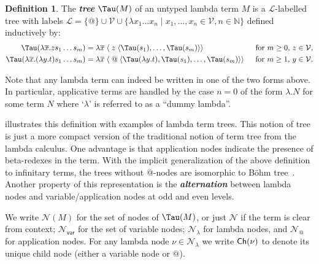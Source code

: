 \documentclass[xchauthor,chkrefs,GCNS,amsmath,amsthm,rotating,leaveRGB]{tcsg}
\makeatletter
\renewcommand{\index}[1]{}
\theoremstyle{plain}
\theoremstyle{definition}
\newtheorem{definition}{Definition}[section]
\newcommand{\VarSet}{\mathcal{V}}
\newcommand{\Nodes}{\mathcal{N}}
\newcommand{\NodesVar}{\Nodes_{\mathsf{var}}}
\newcommand{\NodesLmd}{\Nodes_\lambda}
\newcommand{\NodesApp}{\Nodes_@}
\newcommand{\child}{{\mathsf{\small Ch}}}
\newcommand{\ctree}{\Tau}
\makeatother
\begin{document}
\begin{definition}
The \textbf{\emph{tree}}\index{tree} $\ctree (M)$ of an untyped lambda term
$M$ is a $\mathcal{L}$-labelled tree with labels $\mathcal{L} = \{ @ \} \cup
\VarSet \cup  \{ \lambda x_{1} \ldots x_{n} \mid x_{1} ,\ldots , x_{n} \in
\VarSet , n\in \mathbb {N}\}$ defined inductively by:
%
\begin{align*}
\ctree (\lambda \overline{x} . z s_{1} \ldots s_{m}) &= \lambda
\overline{x}\; \langle \; z\; \langle \ctree (s_{1}),\ldots ,\ctree
(s_{m})\rangle \rangle &    \hbox{for $m\geq 0$, $z \in \VarSet $},\\
\ctree (\lambda \overline{x} . (\lambda y.t) s_{1} \ldots s_{m}) &= \lambda
\overline{x}\; \langle \; @ \; \langle \ctree (\lambda y.t),\ctree
(s_{1}),\ldots ,\ctree (s_{m}) \rangle \rangle \enspace &  \hbox{for $m\geq
1$, $y\in \VarSet $}.
\end{align*}

Note that any lambda term can indeed be written in one of the two forms
above. In particular, applicative terms are handled by the case $n=0$ of the
form $\lambda . N$ for some term $N$ where `$\lambda $' is referred to as a
``dummy lambda''.

 illustrates this definition with
examples of lambda term trees. This notion of tree is just a more compact
version of the traditional notion of term tree from the lambda calculus. One
advantage is that application nodes indicate the presence of beta-redexes in
the term. With the implicit generalization of the above definition to
infinitary terms, the trees without @-nodes are isomorphic to B\"{o}hm
tree~\cite{Barendregt84}. Another property of this representation is the
\textbf{\emph{alternation}}\index{alternation} between lambda nodes and
variable/application nodes at odd and even levels.

We write $\Nodes (M)$ for the set of nodes of $\ctree (M)$, or just $\Nodes $
if the term is clear from context; $\NodesVar $ for the set of variable
nodes; $\NodesLmd $ for lambda nodes, and $\NodesApp $ for  application
nodes. For any lambda node $\nu \in \NodesLmd $ we write $\child (\nu )$ to
denote its unique child node (either a variable node or $@$).
\end{definition}
\end{document}
